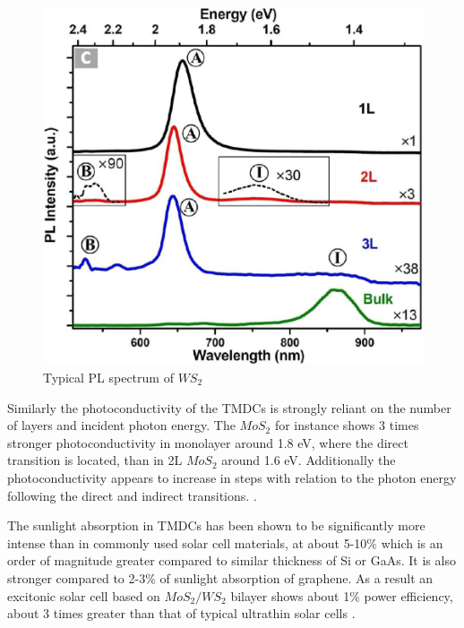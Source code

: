 \begin{figure}[h]
	\begin{center}
		\includegraphics[scale=0.3]{WS2TypicalPLSpectra.png}
		\caption{Typical PL spectrum of $WS_2$}
		\label{fig:WS2TypicalPLSpectra}
	\end{center}
\end{figure}
		
Similarly the photoconductivity of the TMDCs is strongly reliant on the number of layers and incident photon energy. The $MoS_2$ for instance shows 3 times stronger photoconductivity in monolayer around 1.8 eV, where the direct transition is located, than in 2L $MoS_2$ around 1.6 eV. Additionally the photoconductivity appears to increase in steps with relation to the photon energy following the direct and indirect transitions. \cite{ElectronicsAndOptoelectronicsOfTwo-dimensionalTransitionMetalDichalcogenides}.
		
The sunlight absorption in TMDCs has been shown to be significantly more intense than in commonly used solar cell materials, at about 5-10$\%$ which is an order of magnitude greater compared to similar thickness of Si or GaAs. It is also stronger compared to 2-3$\%$ of sunlight absorption of graphene. As a result an excitonic solar cell based on $MoS_2/WS_2$ bilayer shows about 1$\%$ power efficiency, about 3 times greater than that of typical ultrathin solar cells \cite{ExtraordinarySunlightAbsorptionAndOneNanometerThickPhotovoltaicsUsingTwo-DimensionalMonolayerMaterials}.
	

